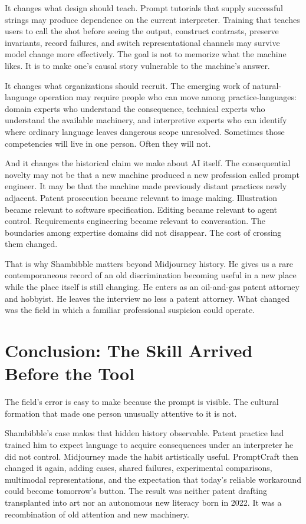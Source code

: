 \documentclass[11pt]{article}
\begin{document}
It changes what design should teach. Prompt tutorials that supply successful strings may produce dependence on the current interpreter. Training that teaches users to call the shot before seeing the output, construct contrasts, preserve invariants, record failures, and switch representational channels may survive model change more effectively. The goal is not to memorize what the machine likes. It is to make one's causal story vulnerable to the machine's answer.

It changes what organizations should recruit. The emerging work of natural-language operation may require people who can move among practice-languages: domain experts who understand the consequence, technical experts who understand the available machinery, and interpretive experts who can identify where ordinary language leaves dangerous scope unresolved. Sometimes those competencies will live in one person. Often they will not.

And it changes the historical claim we make about AI itself. The consequential novelty may not be that a new machine produced a new profession called prompt engineer. It may be that the machine made previously distant practices newly adjacent. Patent prosecution became relevant to image making. Illustration became relevant to software specification. Editing became relevant to agent control. Requirements engineering became relevant to conversation. The boundaries among expertise domains did not disappear. The cost of crossing them changed.

That is why Shambibble matters beyond Midjourney history. He gives us a rare contemporaneous record of an old discrimination becoming useful in a new place while the place itself is still changing. He enters as an oil-and-gas patent attorney and hobbyist. He leaves the interview no less a patent attorney. What changed was the field in which a familiar professional suspicion could operate.

\section{Conclusion: The Skill Arrived Before the Tool}

The field's error is easy to make because the prompt is visible. The cultural formation that made one person unusually attentive to it is not.

Shambibble's case makes that hidden history observable. Patent practice had trained him to expect language to acquire consequences under an interpreter he did not control. Midjourney made the habit artistically useful. PromptCraft then changed it again, adding cases, shared failures, experimental comparisons, multimodal representations, and the expectation that today's reliable workaround could become tomorrow's button. The result was neither patent drafting transplanted into art nor an autonomous new literacy born in 2022. It was a recombination of old attention and new machinery.
\end{document}
